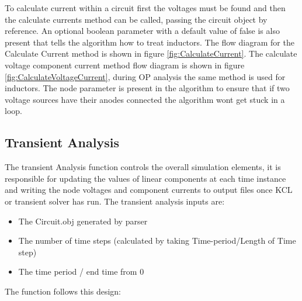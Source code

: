 \documentclass{article}
\begin{document}
To calculate current within a circuit first the voltages must be found and then the calculate currents method can be called, passing the circuit object by reference. An optional boolean parameter with a default value of false is also present that tells the algorithm how to treat inductors. The flow diagram for the Calculate Current method is shown in figure \ref{fig:CalculateCurrent}. The calculate voltage component current method flow diagram is shown in figure \ref{fig:CalculateVoltageCurrent}, during OP analysis the same method is used for inductors. The node parameter is present in the algorithm to ensure that if two voltage sources have their anodes connected the algorithm wont get stuck in a loop. 


\newpage

\subsection{Transient Analysis}\label{ssec:TransientAnalysis}
The transient Analysis function controls the overall simulation elements, it is responsible for updating the values of linear components at each time instance and writing the node voltages and component currents to output files once KCL or transient solver has run. The transient analysis inputs are: 
\begin{itemize}
    \item The Circuit.obj generated by parser
    \item The number of time steps (calculated by taking Time-period/Length of Time step) 
    \item The time period / end time from 0 
\end{itemize}
The function follows this design:
\end{document}
